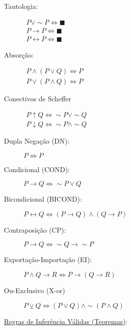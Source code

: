 \documentclass[12pt, a4paper,final]{article}
\begin{document}
\begin{description}
        \item[Tautologia:] $ \begin{array}{l} P\vee \sim P \Leftrightarrow \blacksquare \\ P \rightarrow P \Leftrightarrow \blacksquare \\ P \leftrightarrow P \Leftrightarrow \blacksquare \end{array}$
        
        \item [Absorção:] $\begin{array}{l}P \wedge (P \vee Q) \Leftrightarrow P\\P \vee (P \wedge Q) \Leftrightarrow P\end{array}$
        
        \item[Conectivos de Scheffer] $\begin{array}{l} P \uparrow Q \Leftrightarrow \sim P \vee \sim Q \\  P \downarrow Q \Leftrightarrow \sim P \wedge \sim Q \end{array}$
        
        \item[Dupla Negação (DN):] $P\Leftrightarrow  P$ 
        
        \item[Condicional (COND):] $P\rightarrow Q \Leftrightarrow\sim P \vee Q$
        
        \item[Bicondicional (BICOND):] $P\leftrightarrow Q \Leftrightarrow (P\rightarrow Q)\wedge(Q\rightarrow P)$
        
        \item[Contraposição (CP):] $P\rightarrow Q \Leftrightarrow \sim Q\rightarrow\sim P$
        
        \item[Exportação-Importação (EI):] $P\wedge Q\rightarrow R \Leftrightarrow P\rightarrow(Q\rightarrow R)$
        
        \item[Ou-Exclusivo (X-or)] $P \veebar Q \Leftrightarrow (P \vee Q) \wedge \sim (P \wedge Q)$
        
    \end{description}
    
    
    \newpage

    \underline{{\Large Regras de Inferência Válidas (Teoremas)}}:
\end{document}
